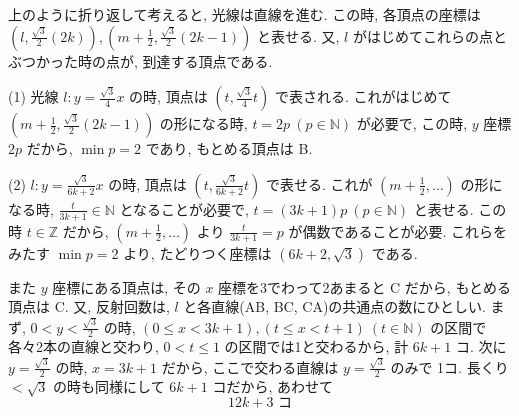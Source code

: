 \documentclass[../main.tex]{subfiles}
\begin{document}
\begin{center}
\end{center}

\noindent
上のように折り返して考えると, 光線は直線を進む. この時, 各頂点の座標は $\left(l, \frac{\sqrt{3}}{2}(2k)\right), \left(m+\frac{1}{2}, \frac{\sqrt{3}}{2}(2k-1)\right)$ と表せる. 又, $l$ がはじめてこれらの点とぶつかった時の点が, 到達する頂点である.

\bigskip

\noindent
(1) 光線 $l : y = \frac{\sqrt{3}}{4}x$ の時, 頂点は $\left(t, \frac{\sqrt{3}}{4}t\right)$ で表される. これがはじめて $\left(m+\frac{1}{2}, \frac{\sqrt{3}}{2}(2k-1)\right)$ の形になる時, $t = 2p \ (p \in \mathbb{N})$ が必要で, この時, $y$ 座標 $2p$ だから, $\min p = 2$ であり, もとめる頂点は B.

\bigskip

\noindent
(2) $l : y = \frac{\sqrt{3}}{6k+2}x$ の時, 頂点は $\left(t, \frac{\sqrt{3}}{6k+2}t\right)$ で表せる. これが $(m+\frac{1}{2}, \dots)$ の形になる時, $\frac{t}{3k+1} \in \mathbb{N}$ となることが必要で, $t = (3k+1)p \ (p \in \mathbb{N})$ と表せる. この時 $t \in \mathbb{Z}$ だから, $(m+\frac{1}{2}, \dots)$ より $\frac{t}{3k+1} = p$ が偶数であることが必要. これらをみたす $\min p = 2$ より, たどりつく座標は $(6k+2, \sqrt{3})$ である.

また $y$ 座標にある頂点は, その $x$ 座標を3でわって2あまると C だから, もとめる頂点は C. 又, 反射回数は, $l$ と各直線(AB, BC, CA)の共通点の数にひとしい. まず, $0 < y < \frac{\sqrt{3}}{2}$ の時, $(0 \le x < 3k+1), (t \le x < t+1) \ (t \in \mathbb{N})$ の区間で各々2本の直線と交わり, $0 < t \le 1$ の区間では1と交わるから, 計 $6k+1$ コ. 次に $y = \frac{\sqrt{3}}{2}$ の時, $x = 3k+1$ だから, ここで交わる直線は $y = \frac{\sqrt{3}}{2}$ のみで 1コ. 長くり $<\sqrt{3}$ の時も同様にして $6k+1$ コだから, あわせて
\[
  12k+3 \text{ コ}
\]
\end{document}
